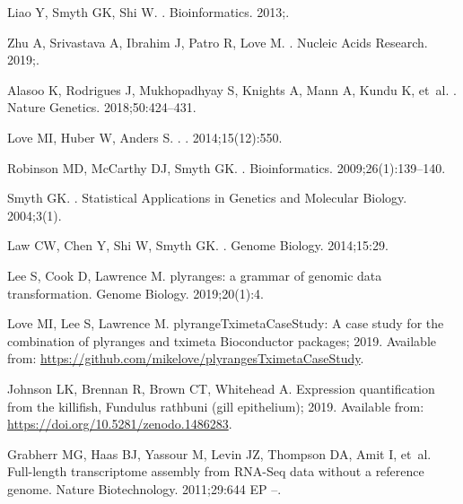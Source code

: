 \documentclass[10pt,letterpaper]{article}
\begin{document}
\begin{thebibliography}{10}
Liao Y, Smyth GK, Shi W.
.
\newblock Bioinformatics. 2013;.

Zhu A, Srivastava A, Ibrahim J, Patro R, Love M.
.
\newblock Nucleic Acids Research. 2019;.

Alasoo K, Rodrigues J, Mukhopadhyay S, Knights A, Mann A, Kundu K, et~al.
.
\newblock Nature Genetics. 2018;50:424--431.

Love MI, Huber W, Anders S.
.
. 2014;15(12):550.

Robinson MD, McCarthy DJ, Smyth GK.
.
\newblock Bioinformatics. 2009;26(1):139--140.

Smyth GK.
.
\newblock Statistical Applications in Genetics and Molecular Biology.
  2004;3(1).

Law CW, Chen Y, Shi W, Smyth GK.
.
\newblock Genome Biology. 2014;15:29.

Lee S, Cook D, Lawrence M.
\newblock plyranges: a grammar of genomic data transformation.
\newblock Genome Biology. 2019;20(1):4.

Love MI, Lee S, Lawrence M. {plyrangeTximetaCaseStudy: A case study for the
  combination of plyranges and tximeta Bioconductor packages}; 2019.
\newblock Available from:
  \url{https://github.com/mikelove/plyrangesTximetaCaseStudy}.

Johnson LK, Brennan R, Brown CT, Whitehead A. {Expression quantification from
  the killifish, Fundulus rathbuni (gill epithelium)}; 2019.
\newblock Available from: \url{https://doi.org/10.5281/zenodo.1486283}.

Grabherr MG, Haas BJ, Yassour M, Levin JZ, Thompson DA, Amit I, et~al.
\newblock Full-length transcriptome assembly from {RNA-Seq} data without a
  reference genome.
\newblock Nature Biotechnology. 2011;29:644 EP --.


\end{thebibliography}
\end{document}
